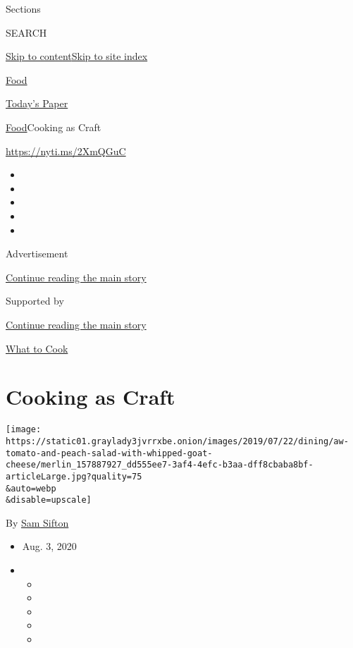 Sections

SEARCH

\protect\hyperlink{site-content}{Skip to
content}\protect\hyperlink{site-index}{Skip to site index}

\href{https://www.nytimes3xbfgragh.onion/section/food}{Food}

\href{https://myaccount.nytimes3xbfgragh.onion/auth/login?response_type=cookie\&client_id=vi}{}

\href{https://www.nytimes3xbfgragh.onion/section/todayspaper}{Today's
Paper}

\href{/section/food}{Food}\textbar{}Cooking as Craft

\url{https://nyti.ms/2XmQGuC}

\begin{itemize}
\item
\item
\item
\item
\item
\end{itemize}

Advertisement

\protect\hyperlink{after-top}{Continue reading the main story}

Supported by

\protect\hyperlink{after-sponsor}{Continue reading the main story}

\href{/column/what-to-cook}{What to Cook}

\hypertarget{cooking-as-craft}{%
\section{Cooking as Craft}\label{cooking-as-craft}}

\texttt{[image: https://static01.graylady3jvrrxbe.onion/images/2019/07/22/dining/aw-tomato-and-peach-salad-with-whipped-goat-cheese/merlin\_157887927\_dd555ee7-3af4-4efc-b3aa-dff8cbaba8bf-articleLarge.jpg?quality=75\\\&auto=webp\\\&disable=upscale]}

By \href{https://www.nytimes3xbfgragh.onion/by/sam-sifton}{Sam Sifton}

\begin{itemize}
\item
  Aug. 3, 2020
\item
  \begin{itemize}
  \item
  \item
  \item
  \item
  \item
  \end{itemize}
\end{itemize}

